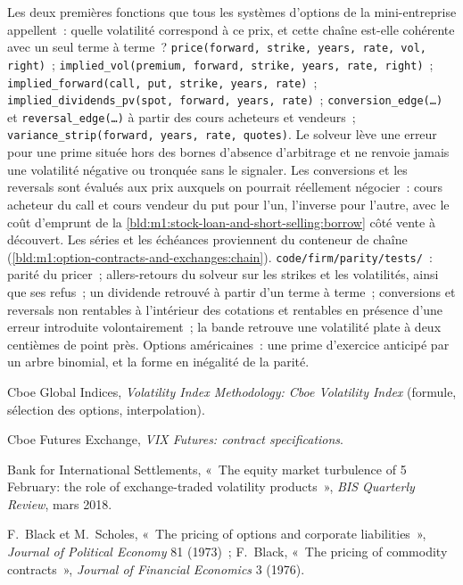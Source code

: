 \begin{build}
 Les deux premières fonctions que tous les systèmes d'options de la mini-entreprise
appellent~: quelle volatilité correspond à ce prix, et cette chaîne est-elle cohérente avec un seul
terme à terme~?
 \texttt{price(forward, strike, years, rate, vol, right)}~;
\texttt{implied\_vol(premium, forward, strike, years, rate, right)}~;
\texttt{implied\_forward(call, put, strike, years, rate)}~;
\texttt{implied\_dividends\_pv(spot, forward, years, rate)}~;
\texttt{conversion\_edge(\ldots)} et \texttt{reversal\_edge(\ldots)} à partir des cours
acheteurs et vendeurs~; \texttt{variance\_strip(forward, years, rate, quotes)}.
 Le solveur lève une erreur pour une prime située hors des bornes
d'absence d'arbitrage et ne renvoie jamais une volatilité négative ou tronquée sans le signaler.
Les conversions et les reversals sont évalués aux prix auxquels on pourrait réellement négocier~:
cours acheteur du call et cours vendeur du put pour l'un, l'inverse pour l'autre, avec le coût
d'emprunt de la \cref{bld:m1:stock-loan-and-short-selling:borrow} côté vente à découvert.
Les séries et les échéances proviennent du conteneur de chaîne
(\cref{bld:m1:option-contracts-and-exchanges:chain}).
 \texttt{code/firm/parity/tests/}~: parité du pricer~; allers-retours du solveur
sur les strikes et les volatilités, ainsi que ses refus~; un dividende retrouvé à partir d'un terme
à terme~; conversions et reversals non rentables à l'intérieur des cotations et rentables
en présence d'une erreur introduite volontairement~; la bande retrouve une volatilité plate
à deux centièmes de point près.
 Options américaines~: une prime d'exercice anticipé par un arbre
binomial, et la forme en inégalité de la parité.
\end{build}

\begin{omsources}
\item Cboe Global Indices, \emph{Volatility Index Methodology: Cboe
Volatility Index} (formule, sélection des options, interpolation).
\item Cboe Futures Exchange, \emph{VIX Futures: contract specifications}.
\item Bank for International Settlements, «~The equity market turbulence of 5
February: the role of exchange-traded volatility products~», \emph{BIS
Quarterly Review}, mars 2018.
\item F.~Black et M.~Scholes, «~The pricing of options and corporate
liabilities~», \emph{Journal of Political Economy} 81 (1973)~; F.~Black,
«~The pricing of commodity contracts~», \emph{Journal of Financial Economics}
3 (1976).
\end{omsources}

